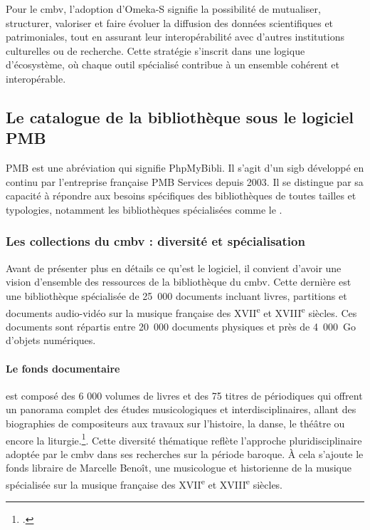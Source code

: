 Pour le \gls{cmbv}, l'adoption d'Omeka-S signifie la possibilité de mutualiser, structurer, valoriser et faire évoluer la diffusion des données scientifiques et patrimoniales, tout en assurant leur interopérabilité avec d'autres institutions culturelles ou de recherche. Cette stratégie s'inscrit dans une logique d'écosystème, où chaque outil spécialisé contribue à un ensemble cohérent et interopérable.

\subsection{Le catalogue de la bibliothèque sous le logiciel PMB}

PMB est une abréviation qui signifie PhpMyBibli. Il s'agit d'un \gls{sigb} développé en continu par l'entreprise française PMB Services depuis 2003. Il se distingue par sa capacité à répondre aux besoins spécifiques des bibliothèques de toutes tailles et typologies, notamment les bibliothèques spécialisées comme le .

\subsubsection{Les collections du \gls{cmbv} : diversité et spécialisation}

Avant de présenter plus en détails ce qu'est le logiciel, il convient d'avoir une vision d'ensemble des ressources de la bibliothèque du \gls{cmbv}. Cette dernière est une bibliothèque spécialisée de 25~000 documents incluant livres, partitions et documents audio-vidéo sur la musique française des XVII\textsuperscript{e} et XVIII\textsuperscript{e} siècles. Ces documents sont répartis entre 20~000 documents physiques et près de 4~000~Go d'objets numériques.

\paragraph{Le fonds documentaire} est composé des 6 000 volumes de livres et des 75 titres de périodiques qui offrent un panorama complet des études musicologiques et interdisciplinaires, allant des biographies de compositeurs aux travaux sur l’histoire, la danse, le théâtre ou encore la liturgie.\footcite{CentreMusiqueBaroqueb}. Cette diversité thématique reflète l'approche pluridisciplinaire adoptée par le \gls{cmbv} dans ses recherches sur la période baroque. À cela s'ajoute le fonds libraire de Marcelle Benoît, une musicologue et historienne de la musique spécialisée sur la musique française des XVII\textsuperscript{e} et XVIII\textsuperscript{e} siècles.

